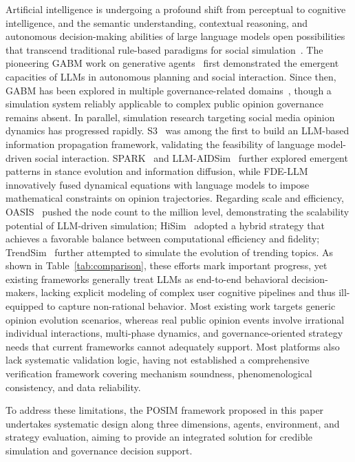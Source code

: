 \documentclass[a4paper,fleqn]{cas-dc}
\begin{document}
Artificial intelligence is undergoing a profound shift from perceptual to cognitive intelligence, and the semantic understanding, contextual reasoning, and autonomous decision-making abilities of large language models open possibilities that transcend traditional rule-based paradigms for social simulation~\citep{wang_survey_2024}. The pioneering GABM work on generative agents~\citep{park_generative_2023} first demonstrated the emergent capacities of LLMs in autonomous planning and social interaction. Since then, GABM has been explored in multiple governance-related domains~\citep{QI2026130753,repec:jas:jasssj:2025-107-3}, though a simulation system reliably applicable to complex public opinion governance remains absent. In parallel, simulation research targeting social media opinion dynamics has progressed rapidly. S3~\citep{gao_s3_2023} was among the first to build an LLM-based information propagation framework, validating the feasibility of language model-driven social interaction. SPARK~\citep{zhang_spark_2025} and LLM-AIDSim~\citep{zhang_llm-aidsim_2025,hu_llm-enhanced_2024} further explored emergent patterns in stance evolution and information diffusion, while FDE-LLM~\citep{yao_social_2025} innovatively fused dynamical equations with language models to impose mathematical constraints on opinion trajectories. Regarding scale and efficiency, OASIS~\citep{yang_oasis_2025} pushed the node count to the million level, demonstrating the scalability potential of LLM-driven simulation; HiSim~\citep{mou_unveiling_2024} adopted a hybrid strategy that achieves a favorable balance between computational efficiency and fidelity; TrendSim~\citep{zhang_trendsim_2025} further attempted to simulate the evolution of trending topics. As shown in Table~\ref{tab:comparison}, these efforts mark important progress, yet existing frameworks generally treat LLMs as end-to-end behavioral decision-makers, lacking explicit modeling of complex user cognitive pipelines and thus ill-equipped to capture non-rational behavior. Most existing work targets generic opinion evolution scenarios, whereas real public opinion events involve irrational individual interactions, multi-phase dynamics, and governance-oriented strategy needs that current frameworks cannot adequately support. Most platforms also lack systematic validation logic, having not established a comprehensive verification framework covering mechanism soundness, phenomenological consistency, and data reliability.

To address these limitations, the POSIM framework proposed in this paper undertakes systematic design along three dimensions, agents, environment, and strategy evaluation, aiming to provide an integrated solution for credible simulation and governance decision support.
\end{document}
